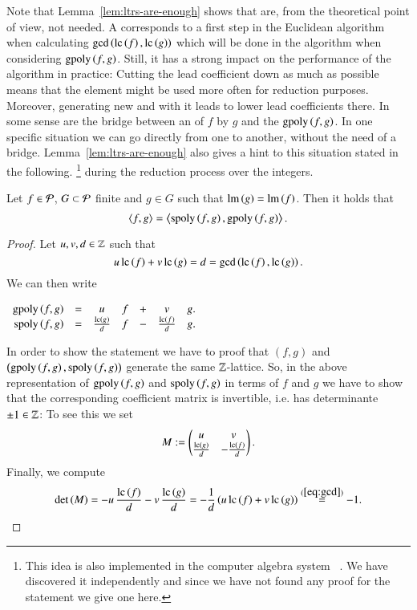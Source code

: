 Note that Lemma~\ref{lem:ltrs-are-enough} shows that \lcrs are, from the
theoretical point of view, not needed. A \lcr corresponds
to a first step in the Euclidean algorithm when calculating $\gcd\left(\mathrm{lc}\left({f}\right), \mathrm{lc}\left({g}\right)\right)$ which will be done in the algorithm when considering $\mathrm{gpoly}\left({f},{g}\right)$.
Still, it has a strong impact on the performance of the algorithm in practice:
Cutting the lead coefficient down as much as possible means that the element
might be used more often for reduction purposes. Moreover, generating new \spts
and \gpts with it leads to lower lead coefficients there. In some sense \lcrs are
the bridge between an \ltr of $f$ by $g$ and the $\mathrm{gpoly}\left({f},{g}\right)$. In one specific
situation we can go directly from one to another, without the need of a bridge. 
Lemma~\ref{lem:ltrs-are-enough} also gives a hint to this situation stated in
the following.
\footnote{This idea is also implemented in the computer algebra system
\macaulay~\cite{macaulay}. We have discovered it independently and since we have not
found any proof for the statement we give one here.}
during the reduction process over the integers.
\begin{lemma}
Let $f \in \mathcal{P}$, $G \subset \mathcal{P}$ finite and $g\in G$ such that
$\operatorname{lm}\left({g}\right) = \operatorname{lm}\left({f}\right)$. Then it holds that
\[\left\langle f,g\right\rangle
  = \left\langle \mathrm{spoly}\left({f},{g}\right), \mathrm{gpoly}\left({f},{g}\right)\right\rangle.\]
  \label{lem:m2-replace-trick}
\end{lemma}

\begin{proof}
Let $u,v, d \in \mathbb{Z}$ such that
\begin{equation}
u\, \mathrm{lc}\left({f}\right) + v\, \mathrm{lc}\left({g}\right) = d = \gcd\left(\mathrm{lc}\left({f}\right), \mathrm{lc}\left({g}\right)\right).
\label{eq:gcd}
\end{equation}
We can then write
\begin{center}
$
\begin{array}[]{rcccccc}
\gpoly fg &= & u& f& + &v& g.\\
\spoly fg &=& \frac{\lc g}{d}& f& - &\frac{\lc f}{d}&g.
\end{array}
$
\end{center}
In order to show the statement we have to proof that $(f,g)$ and $\left(\mathrm{gpoly}\left({f},{g}\right),
\mathrm{spoly}\left({f},{g}\right)\right)$ generate the same $\mathbb{Z}$-lattice. So, in the above
representation of $\mathrm{gpoly}\left({f},{g}\right)$ and $\mathrm{spoly}\left({f},{g}\right)$ in terms of $f$ and $g$ we have to
show that the corresponding coefficient matrix is invertible, i.e. has
determinante $\pm 1 \in \mathbb{Z}$:
To see this we set
\[M := \begin{pmatrix} u & v\\ \frac{\mathrm{lc}\left({g}\right)}{d} & -\frac{\mathrm{lc}\left({f}\right)}{d}\end{pmatrix}.\]
Finally, we compute
\[\det\left(M\right) = - u\, \frac{\mathrm{lc}\left({f}\right)}{d}
- v\, \frac{\mathrm{lc}\left({g}\right)}{d} = -\frac 1d \left(u\, \mathrm{lc}\left({f}\right) + v\, \mathrm{lc}\left({g}\right)\right)
  \stackrel{(\ref{eq:gcd})}{=} -1.\]
\end{proof}

